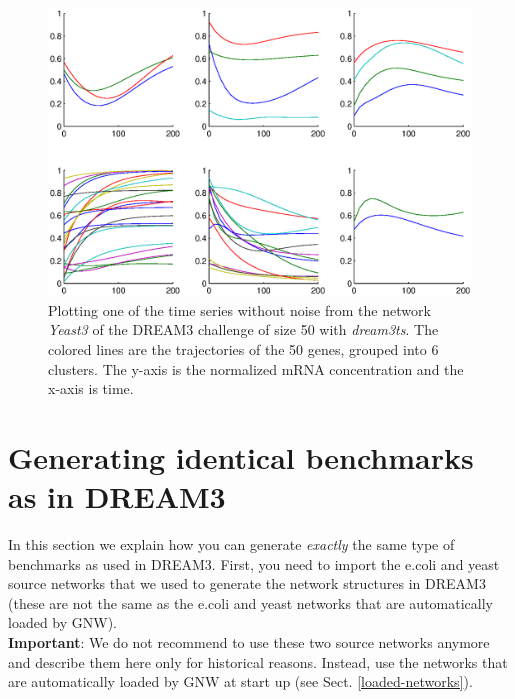 \documentclass{llncs}
\begin{document}
\begin{figure}[tbh]
\label{dream3ts}
\centering\includegraphics[width=\textwidth]{figures/InSilicoSize50-Yeast3-nonoise-ts}
\caption{Plotting one of the time series without noise from the network \emph{Yeast3} of the DREAM3 challenge of size 50 with \emph{dream3ts}. The colored lines are the trajectories of the 50 genes, grouped into 6 clusters. The y-axis is the normalized mRNA concentration and the x-axis is time.}
\end{figure}


\section{Generating identical benchmarks as in DREAM3}
\label{gen-DREAM3-bench}

In this section we explain how you can generate \emph{exactly} the same type of benchmarks as used in DREAM3. First, you need to import the e.coli and yeast source networks that we used to generate the network structures in DREAM3 (these are not the same as the e.coli and yeast networks that are automatically loaded by GNW).\\

\textbf{Important}: We do not recommend to use these two source networks anymore and describe them here only for historical reasons. Instead, use the networks that are automatically loaded by GNW at start up (see Sect. \ref{loaded-networks}).\\
\end{document}
